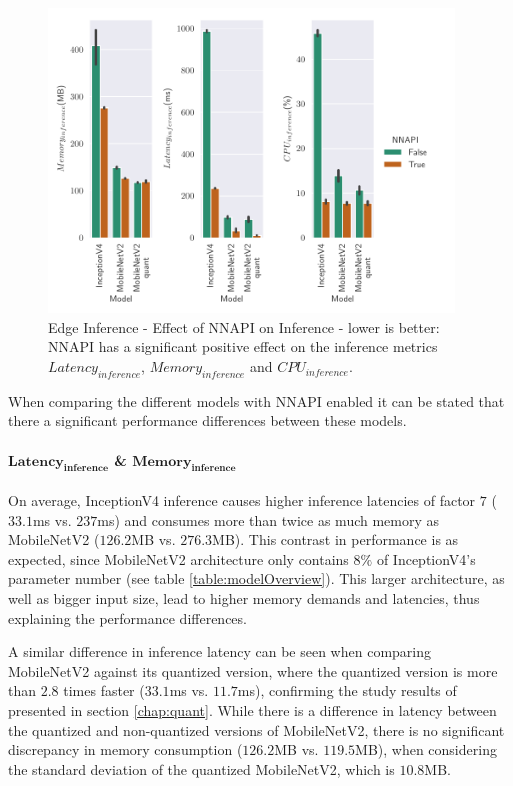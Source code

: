 \begin{figure}[!htb]
\centering
\includegraphics[width=0.96\textwidth]{./Bilder/single_plots/edge_inference_plots/NNAPI_behavior.pdf}
\caption[Edge Inference - Effect of NNAPI on Inference]{Edge Inference - Effect of NNAPI on Inference - lower is better: NNAPI has a significant positive effect on the inference metrics $Latency_{inference}$, $Memory_{inference}$ and $CPU_{inference}$.}
\label{fig:NNAPI}
\end{figure}

When comparing the different models with NNAPI enabled it can be stated that there a significant performance differences between these models.
\paragraph{$\mathbf{Latency_{inference}}$ \& $\mathbf{Memory_{inference}}$}
On average, InceptionV4 inference causes higher inference latencies of factor $7$ ($33.1$ms vs. $237$ms) and consumes more than twice as much memory as MobileNetV2 ($126.2$MB vs. $276.3$MB).
This contrast in performance is as expected, since MobileNetV2 architecture only contains $8\%$ of InceptionV4's parameter number (see table \ref{table:modelOverview}).
This larger architecture, as well as bigger input size, lead to higher memory demands and latencies, thus explaining the performance differences.

A similar difference in inference latency can be seen when comparing MobileNetV2 against its quantized version, where the quantized version is more than $2.8$ times faster ($33.1$ms vs. $11.7$ms), confirming the study results of \cite{Quantizing} presented in section \ref{chap:quant}.
While there is a difference in latency between the quantized and non-quantized versions of MobileNetV2, there is no significant discrepancy in memory consumption ($126.2$MB vs. $119.5$MB), when considering the standard deviation of the quantized MobileNetV2, which is $10.8$MB.



